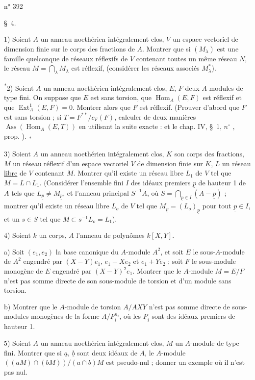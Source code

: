 \hfill n° 392

\S~4.

1) Soient $A$ un anneau noethérien intégralement clos, $V$ un espace vectoriel de dimension finie sur le corps des fractions de $A$. Montrer que si $(M_\lambda)$ est une famille quelconque de réseaux réflexifs de $V$ contenant toutes un même réseau $N$, le réseau $M=\bigcap_\lambda M_\lambda$ est réflexif, (considérer les réseaux associés $M_\lambda^*$).

\textsuperscript{*}2) Soient $A$ un anneau noethérien intégralement clos, $E$, $F$ deux $A$-modules de type fini. On suppose que $E$ est sans torsion, que $\operatorname{Hom}_A(E,F)$ est réflexif et que $\operatorname{Ext}_A^1(E,F)=0$. Montrer alors que $F$ est réflexif. (Prouver d'abord que $F$ est sans torsion ; si $T=F^{**}/c_F(F)$, calculer de deux manières $\operatorname{Ass}(\operatorname{Hom}_A(E,T))$ en utilisant la suite exacte :
et le chap. IV, \S~1, $n^{\circ}$ \quad, prop. \quad). \textsubscript{*}

3) Soient $A$ un anneau noethérien intégralement clos, $K$ son corps des fractions, $M$ un réseau réflexif d'un espace vectoriel $V$ de dimension finie sur $K$, $L$ un réseau \uline{libre} de $V$ contenant $M$. Montrer qu'il existe un réseau libre $L_1$ de $V$ tel que $M=L\cap L_1$. (Considérer l'ensemble fini $I$ des idéaux premiers $\underline{p}$ de hauteur 1 de $A$ tels que $L_{\underline{p}}\ne M_{\underline{p}}$, et l'anneau principal $S^{-1}A$, où $S=\bigcap_{\underline{p}\in I}(A-\underline{p})$ ; montrer qu'il existe un réseau libre $L_o$ de $V$ tel que $M_{\underline{p}}=(L_o)_{\underline{p}}$ pour tout $\underline{p}\in I$, et un $s\in S$ tel que $M\subset s^{-1}L_o=L_1$).

4) Soient $k$ un corps, $A$ l'anneau de polynômes $k[X,Y]$.

a) Soit $(e_1,e_2)$ la base canonique du $A$-module $A^2$, et soit $E$ le sous-$A$-module de $A^2$ engendré par $(X-Y)e_1$, $e_1+Xe_2$ et $e_1+Ye_2$ ; soit $F$ le sous-module monogène de $E$ engendré par $(X-Y)^2e_1$. Montrer que le $A$-module $M=E/F$ n'est pas somme directe de son sous-module de torsion et d'un module sans torsion.

b) Montrer que le $A$-module de torsion $A/AXY$ n'est pas somme directe de sous-modules monogènes de la forme $A/\underline{P}_i^{n_i}$, où les $\underline{P}_i$ sont des idéaux premiers de hauteur 1.

5) Soient $A$ un anneau noethérien intégralement clos, $M$ un $A$-module de type fini. Montrer que si $\underline{a}$, $\underline{b}$ sont deux idéaux de $A$, le $A$-module $((\underline{a} M)\cap(\underline{b} M))/(\underline{a}\cap\underline{b})M$ est pseudo-nul ; donner un exemple où il n'est pas nul.
